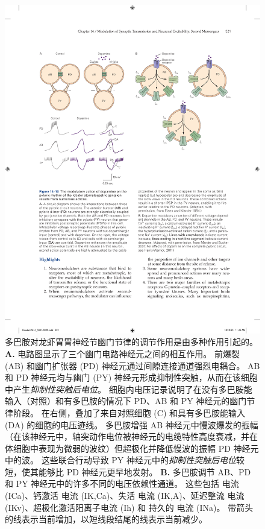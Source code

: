\begin{figure}[htbp]
	\centering
	\includegraphics[width=0.95\linewidth]{chap14/fig_14_13}
	\caption{多巴胺对龙虾胃胃神经节幽门节律的调节作用是由多种作用引起的。
		\textbf{A.} 电路图显示了三个幽门电路神经元之间的相互作用。
		前爆裂 (AB) 和幽门扩张器 (PD) 神经元通过间隙连接通道强烈电耦合。
		AB 和 PD 神经元均与幽门 (PY) 神经元形成抑制性突触，从而在该细胞中产生\textit{抑制性突触后电位}。
		细胞内电压记录说明了在没有多巴胺能输入（对照）和有多巴胺的情况下 PD、AB 和 PY 神经元的幽门节律阶段。
		在右侧，叠加了来自对照细胞 (C) 和具有多巴胺能输入 (DA) 的细胞的电压迹线。
		多巴胺增强 AB 神经元中慢波爆发的振幅（在该神经元中，轴突动作电位被神经元的电缆特性高度衰减，并在体细胞中表现为微弱的波纹）但超极化并降低慢波的振幅 PD 神经元中的波。
		这些联合行动导致 PY 神经元中的\textit{抑制性突触后电位}较短，使其能够比 PD 神经元更早地发射\cite{eisen1984mechanism}。
		\textbf{B.} 多巴胺调节 AB、PD 和 PY 神经元中的许多不同的电压依赖性通道。
		这些包括  电流 (ICa)、钙激活  电流 (IK,Ca)、失活  电流 (IK,A)、延迟整流  电流 (IKv)、超极化激活阳离子电流 (Ih) 和 持久的  电流 (INa)。
		带箭头的线表示当前增加，以短线段结尾的线表示当前减少\cite{marder2007understanding,harris2011neuromodulation}。}
	\label{fig:14_13}
\end{figure}


